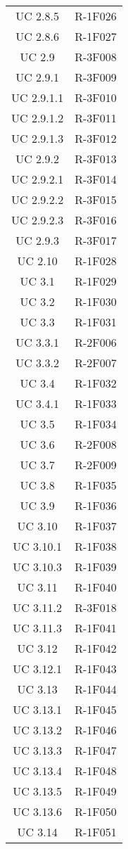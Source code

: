 \begin{tabularx}{\textwidth}{c|c}
		UC 2.8.5 & R-1F026 \\
		UC 2.8.6 & R-1F027 \\
		UC 2.9 & R-3F008 \\
		UC 2.9.1 & R-3F009 \\
		UC 2.9.1.1 & R-3F010 \\
		UC 2.9.1.2 & R-3F011 \\
		UC 2.9.1.3 & R-3F012 \\
		UC 2.9.2 & R-3F013 \\
		UC 2.9.2.1 & R-3F014 \\
		UC 2.9.2.2 & R-3F015 \\
		UC 2.9.2.3 & R-3F016 \\
		UC 2.9.3 & R-3F017 \\
		UC 2.10 & R-1F028 \\
		UC 3.1 & R-1F029 \\
		UC 3.2 & R-1F030 \\
		UC 3.3 & R-1F031 \\
		UC 3.3.1 & R-2F006 \\
		UC 3.3.2 & R-2F007 \\
		UC 3.4 & R-1F032 \\
		UC 3.4.1 & R-1F033 \\
		UC 3.5 & R-1F034 \\
		UC 3.6 & R-2F008 \\
		UC 3.7 & R-2F009 \\
		UC 3.8 & R-1F035 \\
		UC 3.9 & R-1F036 \\
		UC 3.10 & R-1F037 \\
		UC 3.10.1 & R-1F038 \\
		UC 3.10.3 & R-1F039 \\
		UC 3.11 & R-1F040 \\
		UC 3.11.2 & R-3F018 \\
		UC 3.11.3 & R-1F041 \\
		UC 3.12 & R-1F042 \\
		UC 3.12.1 & R-1F043 \\
		UC 3.13 & R-1F044 \\
		UC 3.13.1 & R-1F045 \\
		UC 3.13.2 & R-1F046 \\
		UC 3.13.3 & R-1F047 \\
		UC 3.13.4 & R-1F048 \\
		UC 3.13.5 & R-1F049 \\
		UC 3.13.6 & R-1F050 \\
		UC 3.14 & R-1F051 \\

\end{tabularx}

